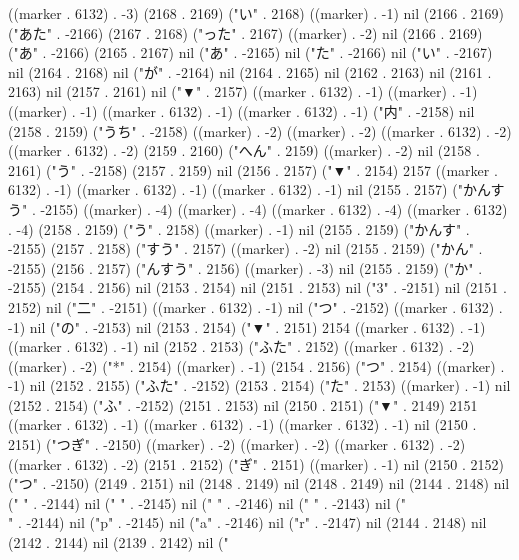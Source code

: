 ((marker . 6132) . -3) (2168 . 2169) ("い" . 2168) ((marker) . -1) nil (2166 . 2169) ("あた" . -2166) (2167 . 2168) ("った" . 2167) ((marker) . -2) nil (2166 . 2169) ("あ" . -2166) (2165 . 2167) nil ("あ" . -2165) nil ("た" . -2166) nil ("い" . -2167) nil (2164 . 2168) nil ("が" . -2164) nil (2164 . 2165) nil (2162 . 2163) nil (2161 . 2163) nil (2157 . 2161) nil ("▼" . 2157) ((marker . 6132) . -1) ((marker) . -1) ((marker) . -1) ((marker . 6132) . -1) ((marker . 6132) . -1) ("内" . -2158) nil (2158 . 2159) ("うち" . -2158) ((marker) . -2) ((marker) . -2) ((marker . 6132) . -2) ((marker . 6132) . -2) (2159 . 2160) ("へん" . 2159) ((marker) . -2) nil (2158 . 2161) ("う" . -2158) (2157 . 2159) nil (2156 . 2157) ("▼" . 2154) 2157 ((marker . 6132) . -1) ((marker . 6132) . -1) ((marker . 6132) . -1) nil (2155 . 2157) ("かんすう" . -2155) ((marker) . -4) ((marker) . -4) ((marker . 6132) . -4) ((marker . 6132) . -4) (2158 . 2159) ("う" . 2158) ((marker) . -1) nil (2155 . 2159) ("かんす" . -2155) (2157 . 2158) ("すう" . 2157) ((marker) . -2) nil (2155 . 2159) ("かん" . -2155) (2156 . 2157) ("んすう" . 2156) ((marker) . -3) nil (2155 . 2159) ("か" . -2155) (2154 . 2156) nil (2153 . 2154) nil (2151 . 2153) nil ("3" . -2151) nil (2151 . 2152) nil ("二" . -2151) ((marker . 6132) . -1) nil ("つ" . -2152) ((marker . 6132) . -1) nil ("の" . -2153) nil (2153 . 2154) ("▼" . 2151) 2154 ((marker . 6132) . -1) ((marker . 6132) . -1) nil (2152 . 2153) ("ふた" . 2152) ((marker . 6132) . -2) ((marker) . -2) ("*" . 2154) ((marker) . -1) (2154 . 2156) ("つ" . 2154) ((marker) . -1) nil (2152 . 2155) ("ふた" . -2152) (2153 . 2154) ("た" . 2153) ((marker) . -1) nil (2152 . 2154) ("ふ" . -2152) (2151 . 2153) nil (2150 . 2151) ("▼" . 2149) 2151 ((marker . 6132) . -1) ((marker . 6132) . -1) ((marker . 6132) . -1) nil (2150 . 2151) ("つぎ" . -2150) ((marker) . -2) ((marker) . -2) ((marker . 6132) . -2) ((marker . 6132) . -2) (2151 . 2152) ("ぎ" . 2151) ((marker) . -1) nil (2150 . 2152) ("つ" . -2150) (2149 . 2151) nil (2148 . 2149) nil (2148 . 2149) nil (2144 . 2148) nil (" " . -2144) nil (" " . -2145) nil (" " . -2146) nil ("
" . -2143) nil ("\\" . -2144) nil ("p" . -2145) nil ("a" . -2146) nil ("r" . -2147) nil (2144 . 2148) nil (2142 . 2144) nil (2139 . 2142) nil ("
